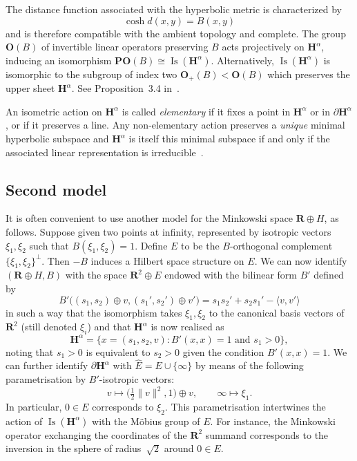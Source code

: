 \documentclass[11pt]{article}
\theoremstyle{definition}
\numberwithin{equation}{section}
\numberwithin{figure}{section}
\numberwithin{table}{section}
\newcommand{\sH}{H}
\newcommand{\RR}{\mathbf{R}}
\newcommand{\HH}{\mathbf{H}}
\newcommand{\OO}{{\mathbf O}}
\newcommand{\PO}{\mathbf{PO}}
\DeclareMathOperator{\Isom}{Is}
\newcommand{\bx}{B'}
\begin{document}
The distance function associated with the hyperbolic metric is characterized by
\[
\cosh d(x,y) = B(x,y)
\]
and is therefore compatible with the ambient topology and complete. The group $\OO(B)$ of invertible linear operators preserving $B$ acts projectively on $\HH^\alpha$, inducing an isomorphism $\PO(B)\cong\Isom(\HH^\alpha)$. Alternatively, $\Isom(\HH^\alpha)$ is isomorphic to the subgroup of index two $\OO_+(B)<\OO(B)$ which preserves the upper sheet $\HH^\alpha$. See Proposition~3.4 in~\cite{Burger-Iozzi-Monod}.

An isometric action on $\HH^\alpha$ is called \emph{elementary} if it fixes a point in $\HH^\alpha$ or in $\partial\HH^\alpha$, or if it preserves a line. Any non-elementary action preserves a \emph{unique} minimal hyperbolic subspace and $\HH^\alpha$ is itself this minimal subspace if and only if the associated linear representation is irreducible~\cite[\S4]{Burger-Iozzi-Monod}.


\subsection{Second model}\label{sec:model}

It is often convenient to use another model for the Minkowski space $\RR\oplus \sH$, as follows. Suppose given two points at infinity, represented by isotropic vectors $\xi_1, \xi_2$ such that $B(\xi_1, \xi_2)=1$. Define $E$ to be the $B$-orthogonal complement $\{\xi_1, \xi_2\}^\perp$. Then $-B$ induces a Hilbert space structure on $E$. We can now identify $(\RR\oplus \sH, B)$ with the space ${\RR^2\oplus E}$ endowed with the bilinear form $\bx$ defined by
\[
\bx\big((s_1,s_2)\oplus v, (s_1', s_2')\oplus v'\big)= s_1 s_2' + s_2 s_1' - \langle v,v'\rangle
\]
in such a way that the isomorphism takes $\xi_1, \xi_2$ to the canonical basis vectors of $\RR^2$ (still denoted $\xi_i$) and that $\HH^\alpha$ is now realised as
\[
\HH^\alpha=\big\{x=(s_1, s_2, v) : B'(x,x) = 1 \text{ and } s_1 > 0\big\},
\]
noting that $s_1>0$ is equivalent to $s_2>0$ given the condition ${B'(x,x) = 1}$. We can further identify $\partial \HH^\alpha$ with $\widehat E=E\cup\{\infty\}$ by means of the following parametrisation by $B'$-isotropic vectors:
\begin{equation}\label{eq:para:bord}
v \longmapsto \big(\tfrac12 \|v\|^2,1\big)\oplus v,\qquad \infty \longmapsto \xi_1.
\end{equation}
In particular, $0\in E$ corresponds to $\xi_2$. This parametrisation intertwines the action of $\Isom(\HH^\alpha)$ with the M\"obius group of $E$. For instance, the Minkowski operator exchanging the coordinates of the $\RR^2$ summand corresponds to the inversion in the sphere of radius~$\sqrt2$ around $0\in E$.
\end{document}
